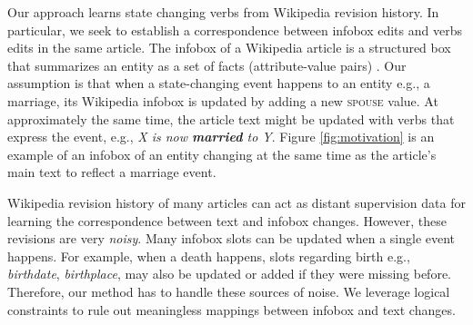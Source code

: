   

Our approach learns state changing verbs from Wikipedia revision history. In particular, we seek to establish a correspondence between infobox edits and verbs edits in the same article. The infobox of a  Wikipedia article is  a structured box that summarizes an entity as a set of facts (attribute-value pairs) . Our assumption is that when a state-changing event happens to an entity e.g., a marriage, its Wikipedia infobox is  updated by adding a new \textsc{spouse} value. 
At approximately the same time, the article text  might be updated with verbs that express the event, e.g., \textit{X is now \textbf{married} to Y}.  Figure \ref{fig:motivation} is an example of an infobox of an entity changing at the same time as the article's main text to reflect a marriage event.

Wikipedia revision history of many articles can act as distant supervision  data for learning the correspondence between text and infobox changes. However, these revisions are very  \textit{noisy}.  Many infobox slots can be  updated when a single event happens.
For example, when a death happens, slots regarding birth e.g., \textit{birthdate}, \textit{birthplace}, may also be updated or added if they were missing before.
Therefore, our method has to handle these sources of noise.  We leverage logical constraints  to rule out meaningless mappings  between infobox and text changes. 

